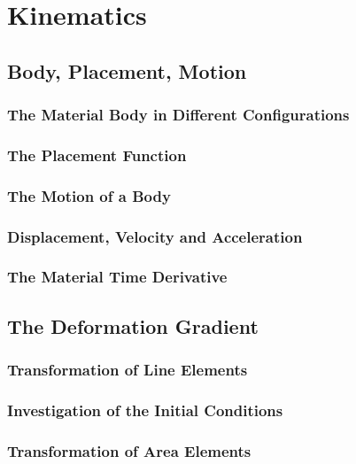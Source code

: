 \documentclass[a5paper,twosided,11pt,DIV=15,BCOR=0mm]{scrbook}
\begin{document}
\chapter{Kinematics}
%
\section{Body, Placement, Motion}

\subsection{The Material Body in Different Configurations}

\subsection{The Placement Function}

\subsection{The Motion of a Body}

\subsection{Displacement, Velocity and Acceleration}

\subsection{The Material Time Derivative}


\section{The Deformation Gradient}

\subsection{Transformation of Line Elements}

\subsection{Investigation of the Initial Conditions}

\subsection{Transformation of Area Elements}
\end{document}
